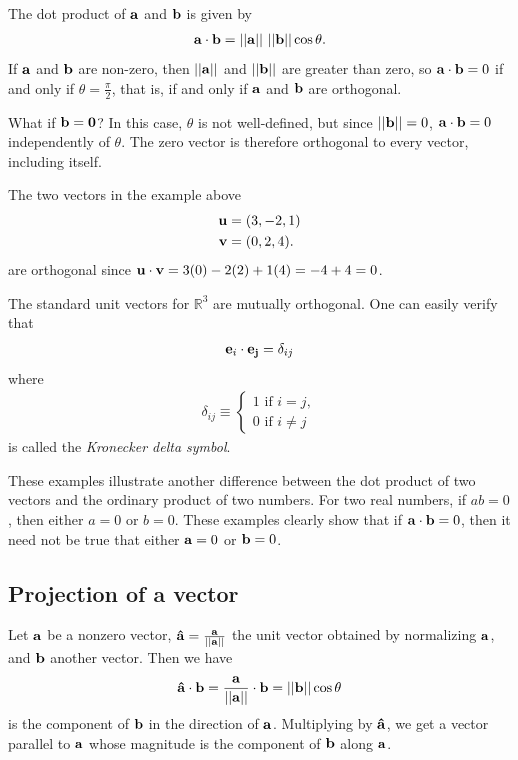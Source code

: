 \documentclass[12pt,letterpaper,reqno]{article}
\numberwithin{equation}{section}
\newcommand{\ti}[1]{\textit{#1}}
\begin{document}
\begin{pf}
	The dot product of ${\bf a}$ and ${\bf b}$ is given by
\begin{align*}
	{\bf a}\cdot {\bf b}=||{\bf a}|| \ ||{\bf b}||\cos \theta.
\end{align*}	
If ${\bf a}$ and ${\bf b}$ are non-zero, then $||{\bf a}||$ and $||{\bf b}||$ are greater than zero, so ${\bf a}\cdot {\bf b}=0$ if and only if $\theta=\frac{\pi}{2}$, that is, if and only if ${\bf a}$ and ${\bf b}$ are orthogonal. 
\end{pf}

What if ${\bf b}={\bf 0}$? In this case, $\theta$ is not well-defined, but since $||{\bf b}||=0$, ${\bf a} \cdot {\bf b}=0$ independently of $\theta$. The zero vector is therefore orthogonal to every vector, including itself.

\begin{example}
The two vectors in the example above	
\begin{align*}
	{\bf u}&=(3,-2,1) \\
	{\bf v}&=(0,2,4).
\end{align*}
are orthogonal since ${\bf u}\cdot {\bf v}=3(0)-2(2)+1(4)=-4+4=0$.
\end{example}

\begin{example}
	The standard unit vectors for $\mathbb{R}^3$ are mutually orthogonal. One can easily verify that 
	\begin{align*}
		{\bf e}_i \cdot {\bf e_j}=\delta_{ij}
	\end{align*}
where 
\begin{align*}
	\delta_{ij} \equiv \begin{cases}
		1 \text{ if } i=j, \\
		0 \text{ if } i \neq j
	\end{cases}
\end{align*}
is called the \ti{Kronecker delta symbol}.
\end{example}

These examples illustrate another difference between the dot product of two vectors and the ordinary product of two numbers. For two real numbers, if $ab=0$, then either $a=0$ or $b=0$. These examples clearly show that if ${\bf a}\cdot {\bf b}=0$, then it need not be true that either ${\bf a}=0$ or ${\bf b}=0$.
\subsection{Projection of a vector}
Let ${\bf a}$ be a nonzero vector, ${\bf \hat{a}}=\frac{{\bf a}}{||{\bf a}||}$ the unit vector obtained by normalizing ${\bf a}$, and ${\bf b}$ another vector. Then we have
\begin{align*}
	{\bf \hat{a}}\cdot {\bf b}=\frac{{\bf a}}{||{\bf a}||} \cdot {\bf b}=||{\bf b}||\cos \theta
\end{align*} 
is the component of ${\bf b}$ in the direction of ${\bf a}$. Multiplying by ${\bf \hat{a}}$, we get a vector parallel to ${\bf a}$ whose magnitude is the component of ${\bf b}$ along ${\bf a}$.
\end{document}
